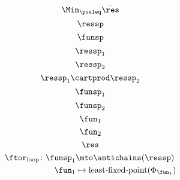{\begin{forslides}
        \begin{equation*}
            \label{eq:opt_6}
            \Min_{\posleq}\bar{\res}
        \end{equation*}
        \begin{equation*}
            \label{eq:genfun_1}
            \ressp
        \end{equation*}
        \begin{equation*}
            \label{eq:genfun_2}
            \funsp
        \end{equation*}
        \begin{equation*}
            \label{eq:genfun_3}
            \ressp_1
        \end{equation*}
        \begin{equation*}
            \label{eq:genfun_3_1}
            \ressp_2
        \end{equation*}
        \begin{equation*}
            \label{eq:genfun_3_2}
            \ressp_1\cartprod \ressp_2
        \end{equation*}
        \begin{equation*}
            \label{eq:genfun_4}
            \funsp_1
        \end{equation*}
        \begin{equation*}
            \label{eq:genfun_5}
            \funsp_2
        \end{equation*}
        \begin{equation*}
            \label{eq:genfun_6}
            \fun_1
        \end{equation*}
        \begin{equation*}
            \label{eq:genfun_7}
            \fun_2
        \end{equation*}
        \begin{equation*}
            \label{eq:genfun_8}
            \res
        \end{equation*}
        \begin{equation*}
            \label{eq:genfun_9}
            \begin{aligned}
                \ftor_\mathrm{loop}\colon \funsp_1 &\mto \antichains(\ressp)\\
                \fun_1&\mapsto \text{least-fixed-point}(\Phi_{\fun_1})
            \end{aligned}
        \end{equation*}
        \begin{equation*}
            \label{eq:genfun_10}

\end{equation*}
\end{forslides}}
